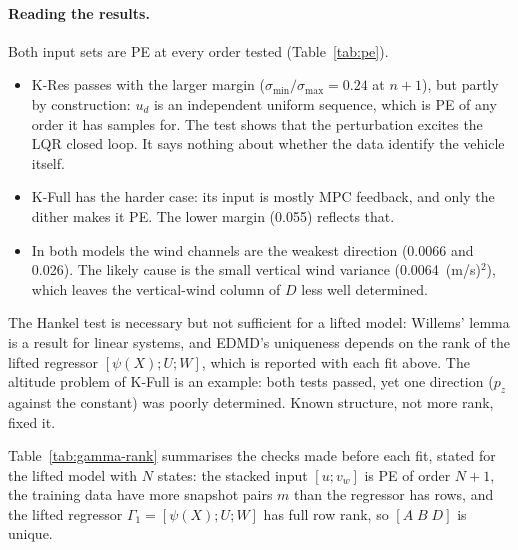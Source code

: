 \documentclass[11pt,a4paper]{article}
\newcommand{\KRes}{\textsf{K-Res}}            %
\newcommand{\KFull}{\textsf{K-Full}}          %
\begin{document}
	\paragraph{Reading the results.}
	Both input sets are PE at every order tested (Table~\ref{tab:pe}).
	\begin{itemize}[leftmargin=*]
		\item \KRes{} passes with the larger margin ($\sigma_{\min}/\sigma_{\max} = 0.24$ at $n+1$),
		but partly by construction: $u_d$ is an independent uniform sequence, which is PE of any order
		it has samples for. The test shows that the perturbation excites the LQR closed loop. It
		says nothing about whether the data identify the vehicle itself.
		\item \KFull{} has the harder case: its input is mostly MPC feedback, and only the dither makes
		it PE. The lower margin (0.055) reflects that.
		\item In both models the wind channels are the weakest direction (0.0066 and 0.026). The likely
		cause is the small vertical wind variance (0.0064~(m/s)$^2$), which leaves the vertical-wind
		column of $D$ less well determined.
	\end{itemize}
	The Hankel test is necessary but not sufficient for a lifted model: Willems' lemma is a result for
	linear systems, and EDMD's uniqueness depends on the rank of the lifted regressor
	$[\psi(X); U; W]$, which is reported with each fit above. The altitude problem of \KFull{} is an
	example: both tests passed, yet one direction ($p_z$ against the constant) was poorly determined.
	Known structure, not more rank, fixed it.

	Table~\ref{tab:gamma-rank} summarises the checks made before each fit, stated for the lifted model
	with $N$ states: the stacked input $[u; v_w]$ is PE of order $N+1$, the training data have more
	snapshot pairs $m$ than the regressor has rows, and the lifted regressor
	$\Gamma_1 = [\psi(X); U; W]$ has full row rank, so $[A\;B\;D]$ is unique.
\end{document}
